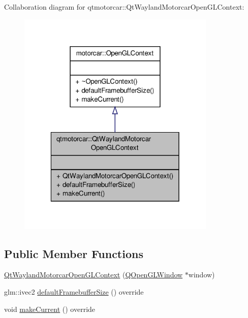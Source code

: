 Collaboration diagram for qtmotorcar\-:\-:Qt\-Wayland\-Motorcar\-Open\-G\-L\-Context\-:
\nopagebreak
\begin{figure}[H]
\begin{center}
\leavevmode
\includegraphics[width=268pt]{classqtmotorcar_1_1QtWaylandMotorcarOpenGLContext__coll__graph}
\end{center}
\end{figure}
\subsection*{Public Member Functions}
\begin{DoxyCompactItemize}
\item 
\hyperlink{classqtmotorcar_1_1QtWaylandMotorcarOpenGLContext_a18441ac9b0796170b33fdfb8c1154e30}{Qt\-Wayland\-Motorcar\-Open\-G\-L\-Context} (\hyperlink{classQOpenGLWindow}{Q\-Open\-G\-L\-Window} $\ast$window)
\item 
glm\-::ivec2 \hyperlink{classqtmotorcar_1_1QtWaylandMotorcarOpenGLContext_ab2a51af3b29de69f0a2d3d60d3bdbe82}{default\-Framebuffer\-Size} () override
\item 
void \hyperlink{classqtmotorcar_1_1QtWaylandMotorcarOpenGLContext_ae5f00ad8258f7c03466ad114b64e250a}{make\-Current} () override
\end{DoxyCompactItemize}


